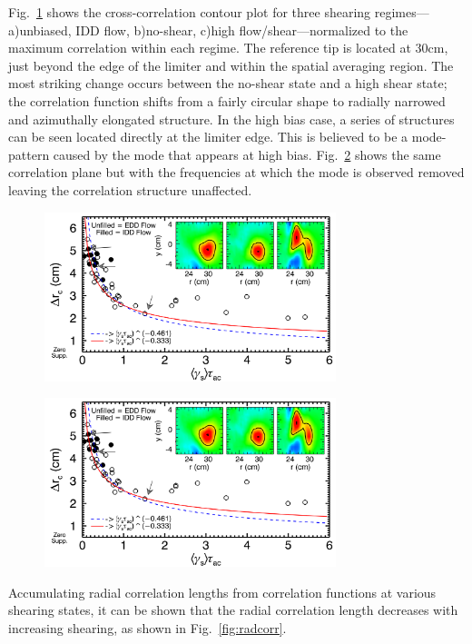 \documentclass[aip,pop,amsmath,amssymb,preprint,superscriptaddress]{revtex4-1} %
\begin{document}
Fig.~\ref{fig:corrplanes} shows the cross-correlation contour plot for three shearing regimes---a)unbiased, IDD flow, b)no-shear, c)high flow/shear---normalized to the maximum correlation within each regime. The reference tip is located at 30cm, just beyond the edge of the limiter and within the spatial averaging region. The most striking change occurs between the no-shear state and a high shear state; the correlation function shifts from a fairly circular shape to radially narrowed and azimuthally elongated structure. In the high bias case, a series of structures can be seen located directly at the limiter edge. This is believed to be a mode-pattern caused by the mode that appears at high bias. Fig.~\ref{fig:filteredhighbias} shows the same correlation plane but with the frequencies at which the mode is observed removed leaving the correlation structure unaffected.

\begin{figure}[!htbp]
\centerline{
\includegraphics[width=8.5cm]{radcorr}}
\caption{\label{fig:corrplanes} }
\end{figure}

\begin{figure}[!htbp]
\centerline{
\includegraphics[width=8.5cm]{radcorr}}
\caption{\label{fig:filteredhighbias} }
\end{figure}

Accumulating radial correlation lengths from correlation functions at various shearing states, it can be shown that the radial correlation length 
decreases with increasing shearing, as shown in
Fig.~\ref{fig:radcorr}.
\end{document}

